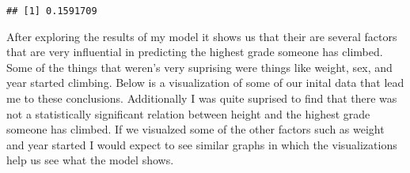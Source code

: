 \documentclass[]{article}
\newenvironment{Shaded}{\begin{snugshade}}{\end{snugshade}}
\newcommand{\DecValTok}[1]{\textcolor[rgb]{0.00,0.00,0.81}{#1}}
\newcommand{\KeywordTok}[1]{\textcolor[rgb]{0.13,0.29,0.53}{\textbf{#1}}}
\newcommand{\NormalTok}[1]{#1}
\newcommand{\OperatorTok}[1]{\textcolor[rgb]{0.81,0.36,0.00}{\textbf{#1}}}
\newcommand{\StringTok}[1]{\textcolor[rgb]{0.31,0.60,0.02}{#1}}
\begin{document}
\begin{Shaded}
\end{Shaded}

\begin{verbatim}
## [1] 0.1591709
\end{verbatim}

After exploring the results of my model it shows us that their are
several factors that are very influential in predicting the highest
grade someone has climbed. Some of the things that weren's very
suprising were things like weight, sex, and year started climbing. Below
is a visualization of some of our inital data that lead me to these
conclusions. Additionally I was quite suprised to find that there was
not a statistically significant relation between height and the highest
grade someone has climbed. If we visualzed some of the other factors
such as weight and year started I would expect to see similar graphs in
which the visualizations help us see what the model shows.

\begin{Shaded}
\end{Shaded}
\end{document}
